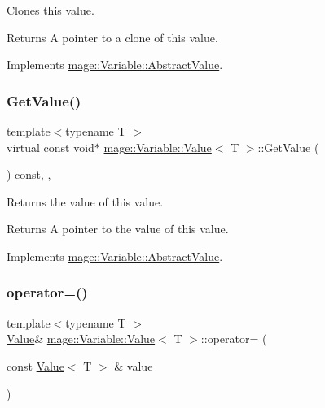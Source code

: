 Clones this value.

\begin{DoxyReturn}{Returns}
A pointer to a clone of this value. 
\end{DoxyReturn}


Implements \hyperlink{structmage_1_1_variable_1_1_abstract_value_aa81140618fdb83ad33f56322a043e23f}{mage\+::\+Variable\+::\+Abstract\+Value}.

\hypertarget{structmage_1_1_variable_1_1_value_af560f450757bd5b40871162cbaf911b3}{}\label{structmage_1_1_variable_1_1_value_af560f450757bd5b40871162cbaf911b3} 
\subsubsection{\texorpdfstring{Get\+Value()}{GetValue()}}
{\footnotesize\ttfamily template$<$typename T $>$ \\
virtual const void$\ast$ \hyperlink{structmage_1_1_variable_1_1_value}{mage\+::\+Variable\+::\+Value}$<$ T $>$\+::Get\+Value (\begin{DoxyParamCaption}{ }\end{DoxyParamCaption}) const\hspace{0.3cm}{\ttfamily [override]}, {\ttfamily [virtual]}, {\ttfamily [noexcept]}}

Returns the value of this value.

\begin{DoxyReturn}{Returns}
A pointer to the value of this value. 
\end{DoxyReturn}


Implements \hyperlink{structmage_1_1_variable_1_1_abstract_value_a857f4e519084841c3dac837771114924}{mage\+::\+Variable\+::\+Abstract\+Value}.

\hypertarget{structmage_1_1_variable_1_1_value_a19c45282edac9ffaa0f687b7dd414392}{}\label{structmage_1_1_variable_1_1_value_a19c45282edac9ffaa0f687b7dd414392} 
\subsubsection{\texorpdfstring{operator=()}{operator=()}\hspace{0.1cm}{\footnotesize\ttfamily [1/2]}}
{\footnotesize\ttfamily template$<$typename T $>$ \\
\hyperlink{structmage_1_1_variable_1_1_value}{Value}\& \hyperlink{structmage_1_1_variable_1_1_value}{mage\+::\+Variable\+::\+Value}$<$ T $>$\+::operator= (\begin{DoxyParamCaption}\item[{const \hyperlink{structmage_1_1_variable_1_1_value}{Value}$<$ T $>$ \&}]{value }\end{DoxyParamCaption})\hspace{0.3cm}{\ttfamily [delete]}}

